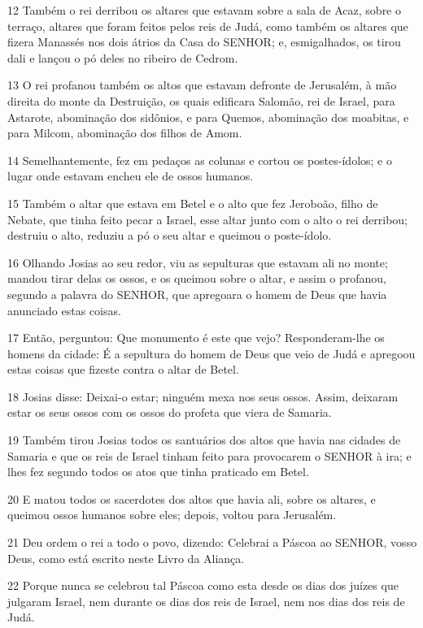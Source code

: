 \par 12 Também o rei derribou os altares que estavam sobre a sala de Acaz, sobre o terraço, altares que foram feitos pelos reis de Judá, como também os altares que fizera Manassés nos dois átrios da Casa do SENHOR; e, esmigalhados, os tirou dali e lançou o pó deles no ribeiro de Cedrom.
\par 13 O rei profanou também os altos que estavam defronte de Jerusalém, à mão direita do monte da Destruição, os quais edificara Salomão, rei de Israel, para Astarote, abominação dos sidônios, e para Quemos, abominação dos moabitas, e para Milcom, abominação dos filhos de Amom.
\par 14 Semelhantemente, fez em pedaços as colunas e cortou os postes-ídolos; e o lugar onde estavam encheu ele de ossos humanos.
\par 15 Também o altar que estava em Betel e o alto que fez Jeroboão, filho de Nebate, que tinha feito pecar a Israel, esse altar junto com o alto o rei derribou; destruiu o alto, reduziu a pó o seu altar e queimou o poste-ídolo.
\par 16 Olhando Josias ao seu redor, viu as sepulturas que estavam ali no monte; mandou tirar delas os ossos, e os queimou sobre o altar, e assim o profanou, segundo a palavra do SENHOR, que apregoara o homem de Deus que havia anunciado estas coisas.
\par 17 Então, perguntou: Que monumento é este que vejo? Responderam-lhe os homens da cidade: É a sepultura do homem de Deus que veio de Judá e apregoou estas coisas que fizeste contra o altar de Betel.
\par 18 Josias disse: Deixai-o estar; ninguém mexa nos seus ossos. Assim, deixaram estar os seus ossos com os ossos do profeta que viera de Samaria.
\par 19 Também tirou Josias todos os santuários dos altos que havia nas cidades de Samaria e que os reis de Israel tinham feito para provocarem o SENHOR à ira; e lhes fez segundo todos os atos que tinha praticado em Betel.
\par 20 E matou todos os sacerdotes dos altos que havia ali, sobre os altares, e queimou ossos humanos sobre eles; depois, voltou para Jerusalém.
\par 21 Deu ordem o rei a todo o povo, dizendo: Celebrai a Páscoa ao SENHOR, vosso Deus, como está escrito neste Livro da Aliança.
\par 22 Porque nunca se celebrou tal Páscoa como esta desde os dias dos juízes que julgaram Israel, nem durante os dias dos reis de Israel, nem nos dias dos reis de Judá.
